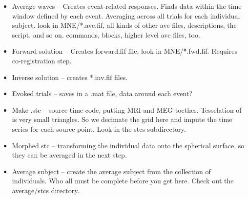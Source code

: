 \documentclass[11pt]{article}
\begin{document}
\begin{itemize}

\item Average waves -- Creates event-related responses.  Finds data
  within the time window defined by each event.  Averaging across all
  trials for each individual subject.  look in MNE/*.ave.fif, all kinds of other ave
  files, descriptions, the script, and so on. commands, blocks, higher
  level ave files, too.

\item Forward solution -- Creates forward.fif file, look in
  MNE/*.fwd.fif.  Requires co-registration step.

\item Inverse solution -- creates *.inv.fif files.

\item Evoked trials -- saves in a .mat file, data around each event?

\item Make .stc -- source time code, putting MRI and MEG toether.
  Tesselation of \fs is very small triangles.  So we decimate
  the grid here and impute the time series for each source point.
  Look in the stcs subdirectory.

\item Morphed stc -- transforming the individual data onto the
  spherical surface, so they can be averaged in the next step.

\item Average subject -- create the average subject from the
  collection of individuals.  Who all must be complete before you get
  here. Check out the average/stcs directory.

\end{itemize}
\end{document}
